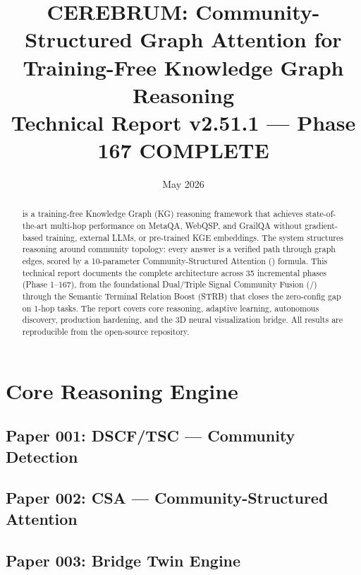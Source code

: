 \documentclass[12pt,a4paper]{article}
\title{
  \textbf{CEREBRUM: Community-Structured Graph Attention for\\
  Training-Free Knowledge Graph Reasoning} \\[0.5em]
  \large Technical Report v2.51.1 — Phase 167 COMPLETE
}
\date{May 2026}
\begin{document}
\maketitle
\thispagestyle{empty}

\begin{abstract}
\CEREBRUM{} is a training-free Knowledge Graph (KG) reasoning framework that
achieves state-of-the-art multi-hop performance on MetaQA, WebQSP, and GrailQA
without gradient-based training, external LLMs, or pre-trained KGE embeddings.
The system structures reasoning around community topology: every answer is a
verified path through graph edges, scored by a 10-parameter Community-Structured
Attention (\CSA{}) formula. This technical report documents the complete
architecture across 35 incremental phases (Phase 1–167), from the foundational
Dual/Triple Signal Community Fusion (\DSCF{}/\TSC{}) through the
Semantic Terminal Relation Boost (\textsc{STRB}) that closes the zero-config gap
on 1-hop tasks. The report covers core reasoning, adaptive learning, autonomous
discovery, production hardening, and the 3D neural visualization bridge.
All results are reproducible from the open-source repository.
\end{abstract}

\newpage
\tableofcontents
\newpage

\part{Core Reasoning Engine}

\chapter*{Paper 001: DSCF/TSC — Community Detection}


\chapter*{Paper 002: CSA — Community-Structured Attention}


\chapter*{Paper 003: Bridge Twin Engine}

\end{document}
